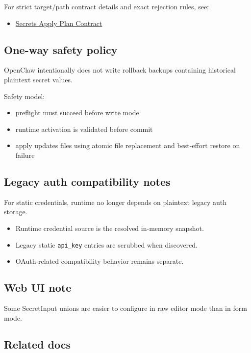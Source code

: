 For strict target/path contract details and exact rejection rules, see:

\begin{itemize}
  \item \href{/gateway/secrets-plan-contract}{Secrets Apply Plan Contract}
\end{itemize}


\subsection{One-way safety policy}


OpenClaw intentionally does not write rollback backups containing historical plaintext secret values.

Safety model:

\begin{itemize}
  \item preflight must succeed before write mode
  \item runtime activation is validated before commit
  \item apply updates files using atomic file replacement and best-effort restore on failure
\end{itemize}


\subsection{Legacy auth compatibility notes}


For static credentials, runtime no longer depends on plaintext legacy auth storage.

\begin{itemize}
  \item Runtime credential source is the resolved in-memory snapshot.
  \item Legacy static \texttt{api\_key} entries are scrubbed when discovered.
  \item OAuth-related compatibility behavior remains separate.
\end{itemize}


\subsection{Web UI note}


Some SecretInput unions are easier to configure in raw editor mode than in form mode.

\subsection{Related docs}


